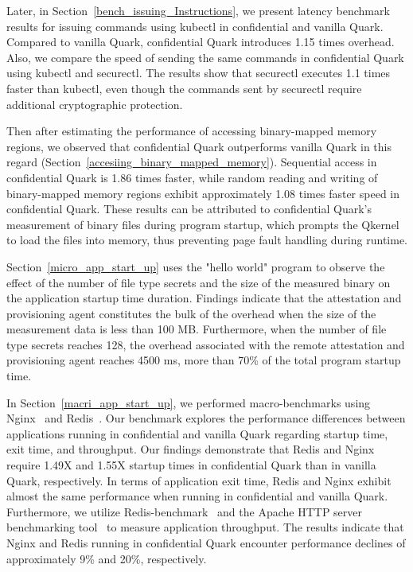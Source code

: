 Later, in Section~\ref{bench_issuing_Instructions}, we present latency benchmark results for issuing commands using kubectl in confidential and vanilla Quark. Compared to vanilla Quark, confidential Quark introduces 1.15 times overhead. Also, we compare the speed of sending the same commands in 
confidential Quark using kubectl and securectl. The results show that securectl executes 1.1 times faster than kubectl, even though the commands sent by securectl require additional cryptographic protection.

Then after estimating the performance of accessing binary-mapped memory regions, we observed that confidential Quark outperforms vanilla Quark in this regard (Section~\ref{accesiing_binary_mapped_memory}). Sequential access in confidential Quark is 1.86 times faster, while random reading and 
writing of binary-mapped memory regions exhibit approximately 1.08 times faster speed in confidential Quark. These results can be attributed to confidential Quark's measurement of binary files during program startup, which prompts the Qkernel to load the files into memory, thus preventing 
page fault handling during runtime.

Section~\ref{micro_app_start_up} uses the "hello world" program to observe the effect of the number of file type secrets and the size of the measured binary on the application startup time duration. Findings indicate that the attestation and provisioning agent constitutes the bulk of the overhead 
when the size of the measurement data is less than 100 MB. Furthermore, when the number of file type secrets reaches 128, the overhead associated with the remote attestation and provisioning agent reaches 4500 ms, more than 70\% of the total program startup time.

In Section~\ref{macri_app_start_up}, we performed macro-benchmarks using Nginx~\cite*{nginx} and Redis~\cite*{redis}. Our benchmark explores the performance differences between applications running in confidential and vanilla Quark regarding startup time, exit time, and throughput. Our 
findings demonstrate that Redis and Nginx require 1.49X and 1.55X startup times in confidential Quark than in vanilla Quark, respectively. In terms of application exit time, Redis and Nginx exhibit almost the same performance when running in confidential and vanilla Quark. Furthermore, we utilize 
Redis-benchmark~\cite*{Redis_benchmark} and the Apache HTTP server benchmarking tool~\cite*{ab} to measure application throughput. The results indicate that Nginx and Redis running in confidential Quark encounter performance declines of approximately 9\% and 20\%, respectively.

